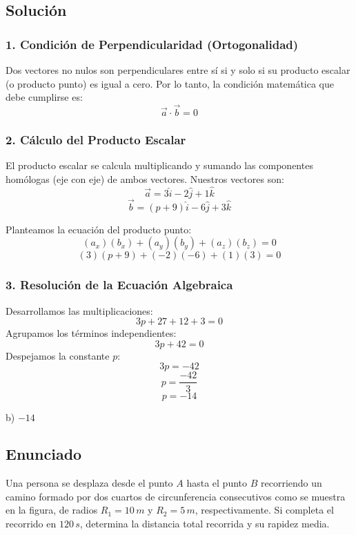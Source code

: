 \documentclass[12pt, a4paper]{article}
\begin{document}
\subsection*{Solución}

\subsubsection*{1. Condición de Perpendicularidad (Ortogonalidad)}
Dos vectores no nulos son perpendiculares entre sí si y solo si su producto escalar (o producto punto) es igual a cero. 
Por lo tanto, la condición matemática que debe cumplirse es:
$$ \vec{a} \cdot \vec{b} = 0 $$

\subsubsection*{2. Cálculo del Producto Escalar}
El producto escalar se calcula multiplicando y sumando las componentes homólogas (eje con eje) de ambos vectores.
Nuestros vectores son:
$$ \vec{a} = 3\hat{i} - 2\hat{j} + 1\hat{k} $$
$$ \vec{b} = (p + 9)\hat{i} - 6\hat{j} + 3\hat{k} $$

Planteamos la ecuación del producto punto:
$$ (a_x)(b_x) + (a_y)(b_y) + (a_z)(b_z) = 0 $$
$$ (3)(p + 9) + (-2)(-6) + (1)(3) = 0 $$

\subsubsection*{3. Resolución de la Ecuación Algebraica}
Desarrollamos las multiplicaciones:
$$ 3p + 27 + 12 + 3 = 0 $$
Agrupamos los términos independientes:
$$ 3p + 42 = 0 $$
Despejamos la constante $p$:
$$ 3p = -42 $$
$$ p = \frac{-42}{3} $$
$$ p = -14 $$

\begin{tcolorbox}[colback=green!5!white, colframe=green!50!black, title=Respuesta Final]
\centering \Large b) $-14$
\end{tcolorbox}

\newpage

\subsection*{Enunciado}
Una persona se desplaza desde el punto $A$ hasta el punto $B$ recorriendo un camino formado por dos cuartos de circunferencia consecutivos como se muestra en la figura, de radios $R_1 = 10 \, \si{m}$ y $R_2 = 5 \, \si{m}$, respectivamente. Si completa el recorrido en $120 \, \si{s}$, determina la distancia total recorrida y su rapidez media.
\end{document}
